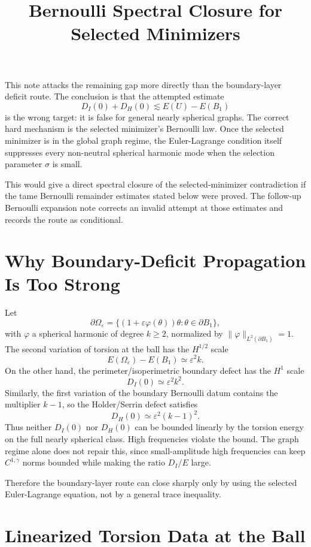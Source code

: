 \documentclass[11pt]{article}
\title{Bernoulli Spectral Closure for Selected Minimizers}
\author{}
\date{}
\begin{document}
\maketitle

This note attacks the remaining gap more directly than the boundary-layer
deficit route. The conclusion is that the attempted estimate
\[
D_I(0)+D_H(0)\lesssim E(U)-E(B_1)
\]
is the wrong target: it is false for general nearly spherical graphs. The
correct hard mechanism is the selected minimizer's Bernoulli law. Once the
selected minimizer is in the global graph regime, the Euler-Lagrange condition
itself suppresses every non-neutral spherical harmonic mode when the selection
parameter \(\sigma\) is small.

This would give a direct spectral closure of the selected-minimizer
contradiction if the tame Bernoulli remainder estimates stated below were
proved. The follow-up Bernoulli expansion note corrects an
invalid attempt at those estimates and records the route as conditional.

\section{Why Boundary-Deficit Propagation Is Too Strong}

Let
\[
\partial\Omega_\varepsilon
=\{(1+\varepsilon\varphi(\theta))\theta:\theta\in\partial B_1\},
\]
with \(\varphi\) a spherical harmonic of degree \(k\ge2\), normalized by
\(\|\varphi\|_{L^2(\partial B_1)}=1\). The second variation of torsion at the
ball has the \(H^{1/2}\) scale
\[
E(\Omega_\varepsilon)-E(B_1)
\simeq
\varepsilon^2 k.
\]
On the other hand, the perimeter/isoperimetric boundary defect has the \(H^1\)
scale
\[
D_I(0)
\simeq
\varepsilon^2 k^2.
\]
Similarly, the first variation of the boundary Bernoulli datum contains the
multiplier \(k-1\), so the Holder/Serrin defect satisfies
\[
D_H(0)\simeq \varepsilon^2(k-1)^2.
\]
Thus neither \(D_I(0)\) nor \(D_H(0)\) can be bounded linearly by the torsion
energy on the full nearly spherical class. High frequencies violate the bound.
The graph regime alone does not repair this, since small-amplitude high
frequencies can keep \(C^{1,\gamma}\) norms bounded while making the ratio
\(D_I/E\) large.

Therefore the boundary-layer route can close sharply only by using the
selected Euler-Lagrange equation, not by a general trace inequality.

\section{Linearized Torsion Data at the Ball}
\end{document}

